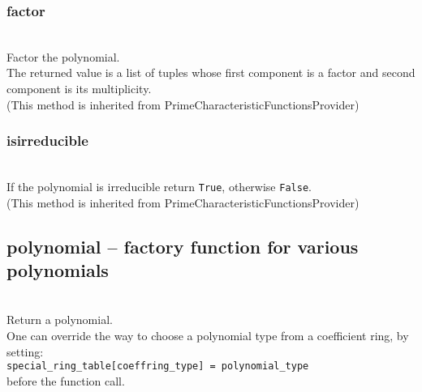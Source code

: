  \subsubsection{factor}
  \\
  \spacing
  \quad Factor the polynomial.\\
  \spacing
  \quad The returned value is a list of tuples whose first component
  is a factor and second component is its multiplicity.\\
  (This method is inherited from PrimeCharacteristicFunctionsProvider)

  \subsubsection{isirreducible}
  \\
  \quad If the polynomial is irreducible return {\tt True},
  otherwise {\tt False}.\\
  (This method is inherited from PrimeCharacteristicFunctionsProvider)


  \subsection{polynomial -- factory function for various polynomials}
  \\
   \spacing
   \quad Return a polynomial.\\
   \spacing
   \quad \negok One can override the way to choose a polynomial type
   from a coefficient ring, by setting:\\
   {\tt special\_ring\_table[coeffring\_type] = polynomial\_type}\\
   before the function call.
\C



